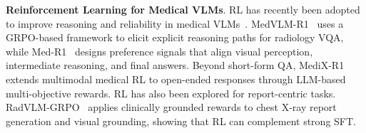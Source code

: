 \documentclass[letterpaper]{article} %
\begin{document}


\vspace{1pt}
\noindent \textbf{Reinforcement Learning for Medical VLMs}. 
RL has recently been adopted to improve reasoning and reliability in medical VLMs~\cite{jing2026reason,zhou-etal-2026-enhancing}. 
MedVLM-R1~\cite{pan2025medvlm} uses a GRPO-based framework to elicit explicit reasoning paths for radiology VQA, while Med-R1~\cite{lai2026med} designs preference signals that align visual perception, intermediate reasoning, and final answers. 
Beyond short-form QA, MediX-R1~\cite{mullappilly2026medix} extends multimodal medical RL to open-ended responses through LLM-based multi-objective rewards. 
RL has also been explored for report-centric tasks. 
RadVLM-GRPO~\cite{gundersen2026radvlm} applies clinically grounded rewards to chest X-ray report generation and visual grounding, showing that RL can complement strong SFT.  
\end{document}
